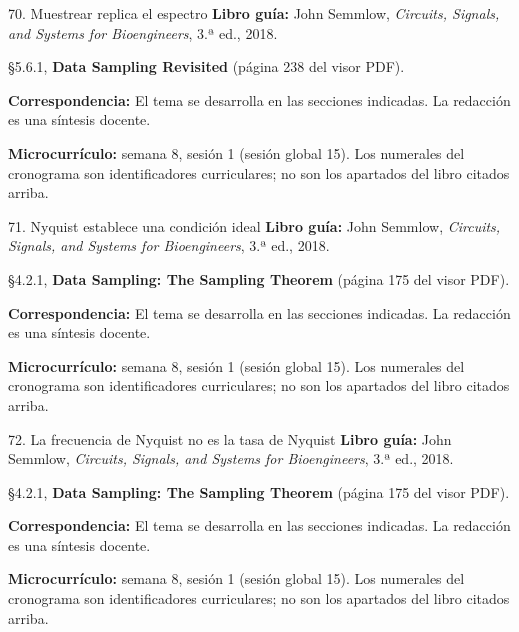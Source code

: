 \documentclass[
  10pt,
  ignorenonframetext,
  aspectratio=169,
  spanish,
]{beamer}
\begin{document}
\begin{frame}{70. Muestrear replica el espectro}
\label{muestrear-replica-el-espectro}
\textbf{Libro guía:} John Semmlow, \emph{Circuits, Signals, and Systems
for Bioengineers}, 3.ª ed., 2018.

§5.6.1, \textbf{Data Sampling Revisited} (página 238 del visor PDF).

\textbf{Correspondencia:} El tema se desarrolla en las secciones
indicadas. La redacción es una síntesis docente.

\textbf{Microcurrículo:} semana 8, sesión 1 (sesión global 15). Los
numerales del cronograma son identificadores curriculares; no son los
apartados del libro citados arriba.
\end{frame}

\begin{frame}{71. Nyquist establece una condición ideal}
\label{nyquist-establece-una-condiciuxf3n-ideal}
\textbf{Libro guía:} John Semmlow, \emph{Circuits, Signals, and Systems
for Bioengineers}, 3.ª ed., 2018.

§4.2.1, \textbf{Data Sampling: The Sampling Theorem} (página 175 del
visor PDF).

\textbf{Correspondencia:} El tema se desarrolla en las secciones
indicadas. La redacción es una síntesis docente.

\textbf{Microcurrículo:} semana 8, sesión 1 (sesión global 15). Los
numerales del cronograma son identificadores curriculares; no son los
apartados del libro citados arriba.
\end{frame}

\begin{frame}{72. La frecuencia de Nyquist no es la tasa de Nyquist}
\label{la-frecuencia-de-nyquist-no-es-la-tasa-de-nyquist}
\textbf{Libro guía:} John Semmlow, \emph{Circuits, Signals, and Systems
for Bioengineers}, 3.ª ed., 2018.

§4.2.1, \textbf{Data Sampling: The Sampling Theorem} (página 175 del
visor PDF).

\textbf{Correspondencia:} El tema se desarrolla en las secciones
indicadas. La redacción es una síntesis docente.

\textbf{Microcurrículo:} semana 8, sesión 1 (sesión global 15). Los
numerales del cronograma son identificadores curriculares; no son los
apartados del libro citados arriba.
\end{frame}
\end{document}
